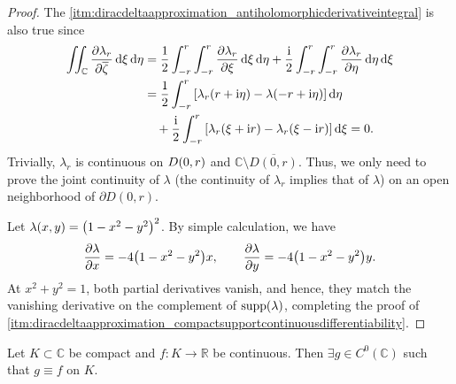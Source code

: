 \begin{proof}
    The \cref{itm:diracdeltaapproximation_antiholomorphicderivativeintegral} is also true since
    \begin{align*}
        \iint_{\mathbb{C}}\pdv{\lambda_r}{\overline{\zeta}}\dd{\xi}\dd{\eta} & =\frac{1}{2}\int_{-r}^r\int_{-r}^{r}\pdv{\lambda_r}{\xi}\dd{\xi}\dd{\eta}+\frac{\mathrm{i}}{2}\int_{-r}^r\int_{-r}^{r}\pdv{\lambda_r}{\eta}\dd{\eta}\dd{\xi} \\
        & =\frac{1}{2}\int_{-r}^r\qty[\lambda_r\qty(r+\mathrm{i}\eta)-\lambda\qty(-r+\mathrm{i}\eta)]\dd{\eta}                                                                \\
        & \quad+\frac{\mathrm{i}}{2}\int_{-r}^r\qty[\lambda_r(\xi+\mathrm{i} r)-\lambda_r(\xi-\mathrm{i} r)]\dd{\xi}=0.
    \end{align*}
    Trivially, \(\lambda_r\) is continuous on \(D\qty(0,r)\) and \(\mathbb{C}\setminus\overline{D(0,r)}\). Thus, we only need to prove the joint continuity of \(\lambda\) (the continuity of \(\lambda_r\) implies that of \(\lambda\)) on an open neighborhood of \(\partial D(0,r)\).

    Let \(\lambda(x,y)=\qty(1-x^2-y^2)^2\). By simple calculation, we have \[\pdv{\lambda}{x}=-4\qty(1-x^2-y^2)x,\qquad\pdv{\lambda}{y}=-4\qty(1-x^2-y^2)y.\] At \(x^2+y^2=1\), both partial derivatives vanish, and hence, they match the vanishing derivative on the complement of \(\operatorname{supp}(\lambda)\), completing the proof of \cref{itm:diracdeltaapproximation_compactsupportcontinuousdifferentiability}.
\end{proof}
\begin{theorem}\label{thm:tietzeextension}
    Let \(K\subset\mathbb{C}\) be compact and \(f:K\to\mathbb{R}\) be continuous. Then \(\exists g\in C^0(\mathbb{C})\) such that \(g\equiv f\) on \(K\).
\end{theorem}
